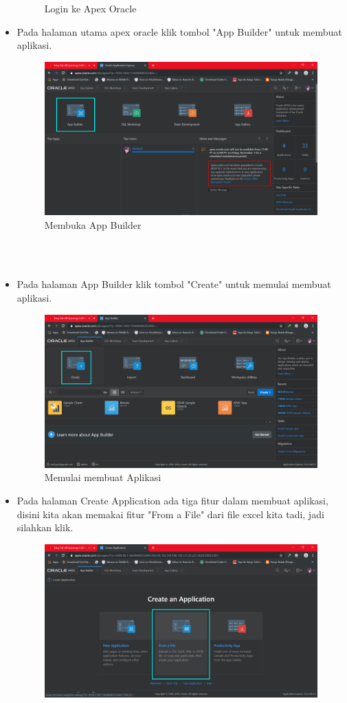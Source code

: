 \documentclass[12pt, times new roman]{article}
\begin{document}
\begin{itemize}
\begin{figure}[htbp]
	\caption{Login ke Apex Oracle}
\end{figure}
\item Pada halaman utama apex oracle klik tombol "App Builder" untuk membuat aplikasi.
\begin{figure}[htbp]
	\centering
	\includegraphics[width=10.5cm]{figures/3.png}
	\caption{Membuka App Builder}
\end{figure}\\
\\
\item Pada halaman App Builder klik tombol "Create" untuk memulai membuat aplikasi.
\begin{figure}[htbp]
	\centering
	\includegraphics[width=10.5cm]{figures/4.png}
	\caption{Memulai membuat Aplikasi}
\end{figure}
\item Pada halaman Create Application ada tiga fitur dalam membuat aplikasi, disini kita akan memakai fitur "From a File" dari file excel kita tadi, jadi silahkan klik.
\begin{figure}[htbp]
	\centering
	\includegraphics[width=10.5cm]{figures/5.png}

\end{figure}
\end{itemize}
\end{document}
